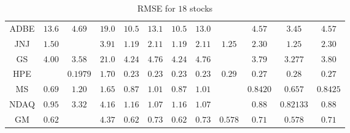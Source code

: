 \documentclass[12pt, A4]{article}
\begin{document}
\begin{landscape}
\begin{table}[H]
\begin{center}
\begin{tabular}{| c | c | c | c | c | c | c | c | c | c | c | c |}
				ADBE & $13.6$ & $4.69$ & $19.0$ & $10.5$ & $13.1$ & $10.5$ & $13.0$ &\cellcolor{blue!25}   \boldmath{$3.44$} & $4.57$ & $3.45$ & $4.57$\\ \cline{1-12}
				JNJ & $1.50$ &\cellcolor{blue!25}   \boldmath{$1.15$} & $3.91$ & $1.19$ & $2.11$ & $1.19$ & $2.11$ & $1.25$ & $2.30$ & $1.25$ & $2.30$\\ \cline{1-12}
				GS & $4.00$ & $3.58$ & $21.0$ & $4.24$ & $4.76$ & $4.24$ & $4.76$ & \cellcolor{blue!25}  \boldmath{$3.276$} & $3.79$ & $3.277$ & $3.80$\\ \cline{1-12}
				HPE & \cellcolor{blue!25}  \boldmath{$0.1975$} & $0.1979$ & $1.70$ & $0.23$ & $0.23$ & $0.23$ & $0.23$ & $0.29$ & $0.27$ & $0.28$ & $0.27$\\ \cline{1-12}
				MS & $0.69$ & $1.20$ & $1.65$ & $0.87$ & $1.01$ & $0.87$ & $1.01$ & \cellcolor{blue!25}  \boldmath{$0.656$} & $0.8420$ & $0.657$ & $0.8425$\\ \cline{1-12}
				NDAQ & $0.95$ & $3.32$ & $4.16$ & $1.16$ & $1.07$ & $1.16$ & $1.07$ &\cellcolor{blue!25}   \boldmath{$0.82132$} & $0.88$ & $0.82133$ & $0.88$\\ \cline{1-12}
				GM & $0.62$ &\cellcolor{blue!25}  \boldmath{$0.573$} & $4.37$ & $0.62$ & $0.73$ & $0.62$ & $0.73$ & $0.578$ & $0.71$ & $0.578$ & $0.71$\\ \cline{1-12}	
			\end{tabular}
			\caption{RMSE for $18$ stocks} \label{stocks RMSE_results}
		\end{center}
	\end{table}
\end{landscape}
\end{document}
